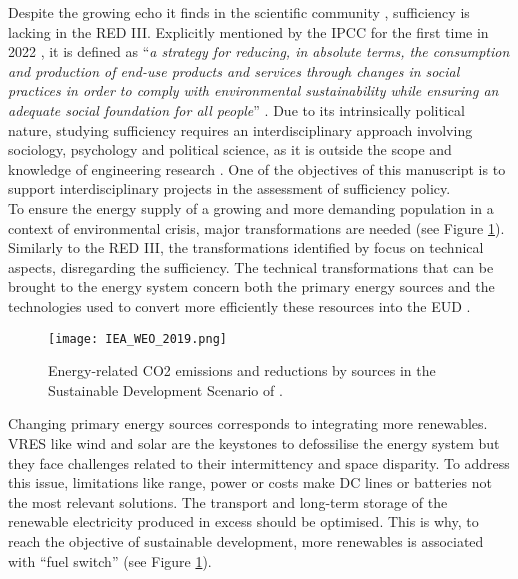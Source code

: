 Despite the growing echo it finds in the scientific community \cite{o2018good}, sufficiency is lacking in the RED III. Explicitly mentioned by the IPCC for the first time in 2022 \cite{IPCC2022}, it is defined as ``\emph{a strategy for reducing, in absolute terms, the consumption and production of end-use products and services through changes in social practices in order to comply with environmental sustainability while ensuring an adequate social foundation for all people}'' \cite{lage2023citizens}. Due to its intrinsically political nature, studying sufficiency requires an interdisciplinary approach involving sociology, psychology and political science, as it is outside the scope and knowledge of engineering research \cite{schmidt2015interdisciplinary}. One of the objectives of this manuscript is to support interdisciplinary projects in the assessment of sufficiency policy. \\

\noindent
To ensure the energy supply of a growing and more demanding population in a context of environmental crisis, major transformations are needed (see Figure \ref{fig:intro:IEA_WEO_2019}). Similarly to the RED III, the transformations identified by \citet{iea2020world} focus on technical aspects, disregarding the sufficiency.  The technical transformations that can be brought to the energy system concern both the primary energy sources and the technologies used to convert more efficiently these resources into the \gls{EUD} \cite{iea2020world,luderer2018residual}. 

\begin{figure}[ht!]
\centering
\texttt{[image: IEA\_WEO\_2019.png]}
\caption{Energy-related CO2 emissions and reductions by sources in the Sustainable Development Scenario of \citet{iea2020world}.}
\label{fig:intro:IEA_WEO_2019}
\end{figure}

Changing primary energy sources corresponds to integrating more renewables. \gls{VRES} like wind and solar are the keystones to defossilise the energy system but they face challenges related to their intermittency and space disparity.  To address this issue,  limitations like range, power or  costs make \gls{DC} lines or batteries not the most relevant solutions.  The transport and long-term storage of the renewable electricity produced in excess should be optimised.  This is why, to reach the objective of sustainable development, more renewables is associated with ``fuel switch'' (see Figure \ref{fig:intro:IEA_WEO_2019}). 

